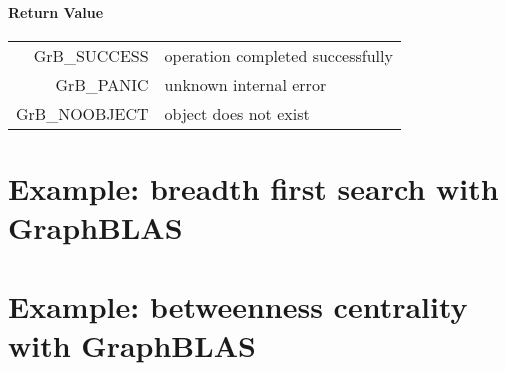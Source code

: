 \documentclass[11pt]{extarticle}
\begin{document}
\paragraph{Return Value}

\begin{tabular}{rl}
{\sf GrB\_SUCCESS}	& operation completed successfully \\
{\sf GrB\_PANIC}	& unknown internal error \\
{\sf GrB\_NOOBJECT}	& object does not exist \\
\end{tabular}



\appendix

\pagebreak

\section{Example: breadth first search with GraphBLAS}
{\scriptsize

}

\pagebreak

\section{Example: betweenness centrality with GraphBLAS}
{\scriptsize

}
\end{document}
